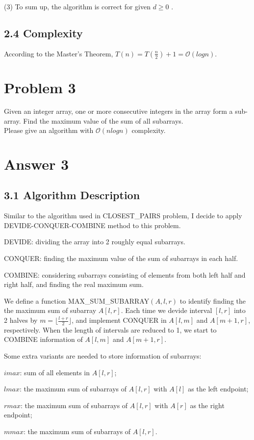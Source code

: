 \documentclass[UTF8]{ctexart}
\begin{document}
(3) To sum up, the algorithm is correct for given $d \geq 0$ .

\subsection*{2.4 Complexity} 
According to the Master's Theorem, $T(n) = T(\frac{n}{2}) + 1 = \mathcal{O}(log n)$.
\section*{Problem 3}
Given an integer array, one or more consecutive integers in the array form a sub-array. Find
the maximum value of the sum of all subarrays.\\
Please give an algorithm with $\mathcal{O}(nlogn)$ complexity.
\section*{Answer 3}
\subsection*{3.1  Algorithm Description}
Similar to the algorithm used in CLOSEST\_PAIRS problem, I decide to apply DEVIDE-CONQUER-COMBINE method to this problem.

DEVIDE: dividing the array into 2 roughly equal subarrays.

CONQUER: finding the maximum value of the sum of subarrays in each half.

COMBINE: considering subarrays consisting of elements from both left half and right half, and finding the real maximum sum.

We define a function MAX\_SUM\_SUBARRAY$(A, l , r)$ to identify finding the the maximum sum of subarray $A[l,r]$. Each time we devide interval $[l,r]$ into 2 halves by 
$m = \lfloor \frac{l+r}{2} \rfloor$, and implement CONQUER in $A[l, m]$ and $A[m+1, r]$, respectively. When the length of intervals are reduced to 1, we start to COMBINE information 
of $A[l, m]$ and $A[m+1, r]$.

Some extra variants are needed to store information of subarrays:

$imax$: sum of all elements in $A[l,r]$;

$lmax$: the maximum sum of subarrays of $A[l,r]$ with $A[l]$ as the left endpoint;

$rmax$: the maximum sum of subarrays of $A[l,r]$ with $A[r]$ as the right endpoint;

$mmax$: the maximum sum of subarrays of $A[l,r]$.
\end{document}
